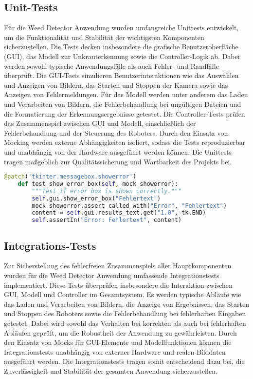 \documentclass[12pt, a4paper]{scrreprt}
\begin{document}
\subsection{Unit-Tests}
Für die Weed Detector Anwendung wurden umfangreiche Unittests entwickelt, um die Funktionalität und Stabilität der wichtigsten Komponenten sicherzustellen. Die Tests decken insbesondere die grafische Benutzeroberfläche (GUI), das Modell zur Unkrauterkennung sowie die Controller-Logik ab. Dabei werden sowohl typische Anwendungsfälle als auch Fehler- und Randfälle überprüft. Die GUI-Tests simulieren Benutzerinteraktionen wie das Auswählen und Anzeigen von Bildern, das Starten und Stoppen der Kamera sowie das Anzeigen von Fehlermeldungen. Für das Modell werden unter anderem das Laden und Verarbeiten von Bildern, die Fehlerbehandlung bei ungültigen Dateien und die Formatierung der Erkennungsergebnisse getestet. Die Controller-Tests prüfen das Zusammenspiel zwischen GUI und Modell, einschließlich der Fehlerbehandlung und der Steuerung des Roboters. Durch den Einsatz von Mocking werden externe Abhängigkeiten isoliert, sodass die Tests reproduzierbar und unabhängig von der Hardware ausgeführt werden können. Die Unittests tragen maßgeblich zur Qualitätssicherung und Wartbarkeit des Projekts bei.\\

\begin{lstlisting}[language=Python, caption=Beispiel Unit-Test]
    @patch('tkinter.messagebox.showerror')
    def test_show_error_box(self, mock_showerror):
        """Test if error box is shown correctly."""
        self.gui.show_error_box("Fehlertext")
        mock_showerror.assert_called_with("Error", "Fehlertext")
        content = self.gui.results_text.get("1.0", tk.END)
        self.assertIn("Error: Fehlertext", content)
    \end{lstlisting}

\subsection{Integrations-Tests}
Zur Sicherstellung des fehlerfreien Zusammenspiels aller Hauptkomponenten wurden für die Weed Detector Anwendung umfassende Integrationstests implementiert. Diese Tests überprüfen insbesondere die Interaktion zwischen GUI, Modell und Controller im Gesamtsystem. Es werden typische Abläufe wie das Laden und Verarbeiten von Bildern, die Anzeige von Ergebnissen, das Starten und Stoppen des Roboters sowie die Fehlerbehandlung bei fehlerhaften Eingaben getestet. Dabei wird sowohl das Verhalten bei korrekten als auch bei fehlerhaften Abläufen geprüft, um die Robustheit der Anwendung zu gewährleisten. Durch den Einsatz von Mocks für GUI-Elemente und Modellfunktionen können die Integrationstests unabhängig von externer Hardware und realen Bilddaten ausgeführt werden. Die Integrationstests tragen somit entscheidend dazu bei, die Zuverlässigkeit und Stabilität der gesamten Anwendung sicherzustellen.\\
\end{document}
